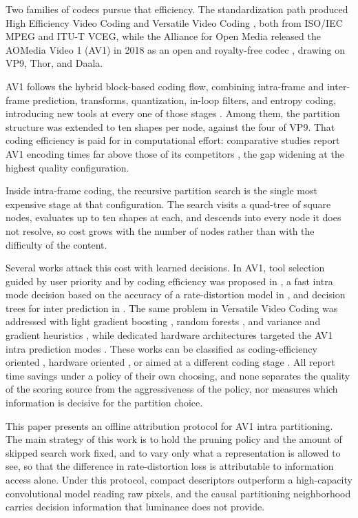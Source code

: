 \documentclass[conference]{IEEEtran}
\begin{document}
Two families of codecs pursue that efficiency. The standardization path produced
High Efficiency Video Coding \cite{hevc} and Versatile Video Coding \cite{vvc},
both from ISO/IEC MPEG and ITU-T VCEG, while the Alliance for Open Media released the AOMedia Video 1 (AV1) in 2018 as an open and royalty-free codec
\cite{av1site}, drawing on VP9, Thor, and Daala.

AV1 follows the hybrid block-based coding flow, combining intra-frame and
inter-frame prediction, transforms, quantization, in-loop filters, and entropy coding, introducing new tools at every one of those stages
\cite{han2021,chen2018}. Among them, the partition structure was extended to ten
shapes per node, against the four of VP9. That coding efficiency is paid for in
computational effort: comparative studies report AV1 encoding times far above
those of its competitors \cite{grois2016,layek2017}, the gap widening at the
highest quality configuration.

Inside intra-frame coding, the recursive partition search is the single most
expensive stage at that configuration. The search visits a quad-tree of square
nodes, evaluates up to ten shapes at each, and descends into every node it does
not resolve, so cost grows with the number of nodes rather than with the
difficulty of the content.

Several works attack this cost with learned decisions. In AV1, tool selection
guided by user priority and by coding efficiency was proposed in
\cite{xu2020,xu2021}, a fast intra mode decision based on the accuracy of a
rate-distortion model in \cite{jeong2019}, and decision trees for inter prediction
in \cite{kim2019}. The same problem in Versatile Video Coding was addressed with
light gradient boosting \cite{saldanha2022}, random forests \cite{he2021}, and
variance and gradient heuristics \cite{chen2019}, while dedicated hardware
architectures targeted the AV1 intra prediction modes \cite{correa2020,netto2022}.
These works can be classified as coding-efficiency oriented
\cite{jeong2019,xu2021,saldanha2022,he2021,chen2019}, hardware oriented
\cite{correa2020,netto2022}, or aimed at a different coding stage
\cite{xu2020,kim2019}. All report time savings under a policy of their own choosing, and none separates the quality of the scoring source from the aggressiveness of the policy, nor measures which information is decisive
for the partition choice.

This paper presents an offline attribution protocol for AV1 intra partitioning.
The main strategy of this work is to hold the pruning policy and the amount of
skipped search work fixed, and to vary only what a representation is allowed to
see, so that the difference in rate-distortion loss is attributable to
information access alone. Under this protocol, compact descriptors outperform a
high-capacity convolutional model reading raw pixels, and the causal
partitioning neighborhood carries decision information that luminance does not
provide.
\end{document}
